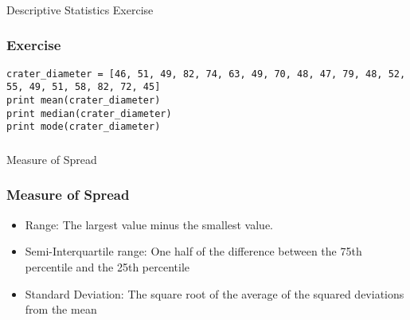 

\begin{frame}[fragile]\frametitle{}
\begin{center}
{\Large Descriptive Statistics Exercise}
\end{center}
\end{frame}

\begin{frame}[fragile]\frametitle{Exercise}	
\begin{lstlisting}
crater_diameter = [46, 51, 49, 82, 74, 63, 49, 70, 48, 47, 79, 48, 52, 55, 49, 51, 58, 82, 72, 45]
print mean(crater_diameter)
print median(crater_diameter)
print mode(crater_diameter)
\end{lstlisting}

\end{frame}


\begin{frame}[fragile]\frametitle{}
\begin{center}
{\Large Measure of Spread}
\end{center}
\end{frame}

\begin{frame}[fragile]\frametitle{Measure of Spread}	

\begin{itemize}
\item Range: The largest value minus the smallest value.
\item Semi-Interquartile range: One half of the difference between the 75th percentile and the 25th percentile
\item Standard Deviation:	The square root of the average of the squared deviations from the mean
\end{itemize}


\end{frame}



